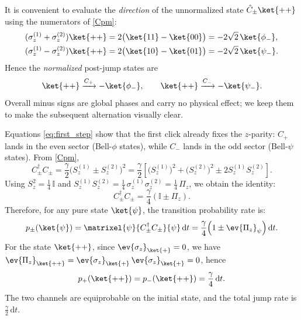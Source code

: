 It is convenient to evaluate the \emph{direction} of the unnormalized state \(\hat{C}_\pm\ket{++}\) using the numerators of \eqref{Cpm}:
\begin{align}
	(\sigma_z^{(1)}+\sigma_z^{(2)})\ket{++}
	&=2\big(\ket{11}-\ket{00}\big)
	=-2\sqrt{2}\,\ket{\phi_-},\label{eq:sigplus_on_pp}\\
	(\sigma_z^{(1)}-\sigma_z^{(2)})\ket{++}
	&=2\big(\ket{10}-\ket{01}\big)
	=-2\sqrt{2}\,\ket{\psi_-}.
	\label{eq:sigminus_on_pp}
\end{align}
Hence the \emph{normalized} post-jump states are
\begin{equation}
	\ket{++}\xrightarrow{C_+}-\ket{\phi_-},
	\qquad
	\ket{++}\xrightarrow{C_-}-\ket{\psi_-}.
	\label{eq:first_step}
\end{equation}
Overall minus signs are global phases and carry no physical effect; we keep them to make the subsequent alternation visually clear.

Equations \eqref{eq:first_step} show that the first click already fixes the $z$-parity: $C_+$ lands in the even sector (Bell-$\phi$ states), while $C_-$ lands in the odd sector (Bell-$\psi$ states).
From \eqref{Cpm},
\begin{equation}
	C_\pm^\dagger C_\pm
	=\frac{\gamma}{2}\big(S_z^{(1)}\pm S_z^{(2)}\big)^2
	=\frac{\gamma}{2}\left[\big(S_z^{(1)}\big)^2+\big(S_z^{(2)}\big)^2\pm2S_z^{(1)}S_z^{(2)}\right].
\end{equation}
Using \(S_z^2=\tfrac{1}{4}\,\mathbb{I}\) and \(S_z^{(1)}S_z^{(2)}=\tfrac{1}{4}\,\sigma_z^{(1)}\sigma_z^{(2)}=\tfrac{1}{4}\,\Pi_z\), we obtain the identity:
\begin{equation}
	C_\pm^\dagger C_\pm
	=\frac{\gamma}{4}\left(\mathbb{I}\pm \Pi_z\right).
	\label{eq:rate_identity}
\end{equation}
Therefore, for any pure state \(\ket{\psi}\), the transition probability rate is:
\begin{equation}
	p_\pm(\ket{\psi})=\matrixel{\psi}{C_\pm^\dagger C_\pm}{\psi}\,\mathrm{d}t
	=\frac{\gamma}{4}\Big(1\pm \ev{\Pi_z}_{\psi}\Big)\,\mathrm{d}t.
	\label{eq:general_rate}
\end{equation}
For the state \(\ket{++}\), since \(\ev{\sigma_z}_{\ket{+}}=0\), we have \(\ev{\Pi_z}_{\ket{++}}=\ev{\sigma_z}_{\ket{+}}\,\ev{\sigma_z}_{\ket{+}}=0\), hence
\begin{equation}
	p_+(\ket{++})=p_-(\ket{++})=\frac{\gamma}{4}\,\mathrm{d}t.
	\label{eq:rates_pp}
\end{equation}
The two channels are equiprobable on the initial state, and the total jump rate is \(\tfrac{\gamma}{2}\,\mathrm{d}t\).

